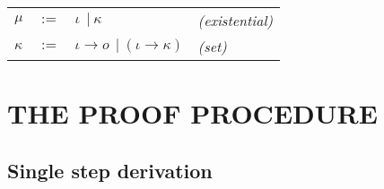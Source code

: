 \documentclass[inscr,ack,preface]{dithesis}
\theoremstyle{definition}
\begin{document}
\begin{center}
  \begin{tabular}{llll}
    $\mu$    & $:=$ & $\iota ~~|~ \kappa$ & \hspace*{2.5cm} \emph{(existential)} \\
    $\kappa$ & $:=$ & $\iota \rightarrow o ~~|~ \left( \iota \rightarrow \kappa \right)$ & \hspace*{2.5cm} \emph{(set)} \\
  \end{tabular}
\end{center}

\chapter{THE PROOF PROCEDURE}

\section{Single step derivation}
\end{document}
